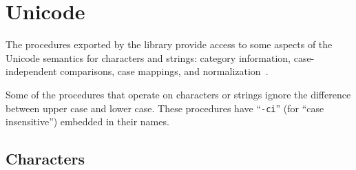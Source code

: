 \chapter{Unicode}
\label{unicodechapter}

The procedures exported by the 
library provide access to some aspects
of the Unicode semantics for characters and strings:
category information, case-independent comparisons,
case mappings, and normalization~\cite{Unicode}.

Some of the procedures that operate on characters or strings ignore the
difference between upper case and lower case.  These procedures
have \hbox{``{\tt -ci}''} (for ``case
insensitive'') embedded in their names.

\section{Characters}

